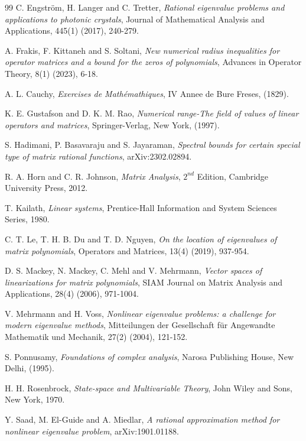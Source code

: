 \documentclass[12pt, reqno]{amsart}
\theoremstyle{definition}
\theoremstyle{remark}
\numberwithin{equation}{section}
\begin{document}
\begin{thebibliography}{99}
C. Engstr\"{o}m, H. Langer and C. Tretter, \emph{Rational eigenvalue problems and 
applications to photonic crystals}, Journal of Mathematical Analysis and Applications, 
445(1) (2017), 240-279.

A. Frakis, F. Kittaneh and S. Soltani, \emph{New numerical radius inequalities 
for operator matrices and a bound for the zeros of polynomials}, Advances in 
Operator Theory, 8(1) (2023), 6-18.

A. L. Cauchy, \emph{Exercises de Math\'emathiques}, IV Annee de Bure Freses, (1829).

K. E. Gustafson and D. K. M. Rao, \emph{Numerical range-The field of values of linear 
operators and matrices}, Springer-Verlag, New York, (1997).

S. Hadimani, P. Basavaraju and S. Jayaraman, \emph{Spectral bounds for certain special 
type of matrix rational functions}, arXiv:2302.02894.

R. A. Horn and C. R. Johnson, \emph{Matrix Analysis}, $2^{nd}$ Edition, 
Cambridge University Press, 2012.

T. Kailath, \emph{Linear systems}, Prentice-Hall Information and System Sciences Series, 
1980.

C. T. Le, T. H. B. Du and T. D. Nguyen, \emph{On the location of eigenvalues of matrix 
polynomials}, Operators and Matrices, 13(4) (2019), 937-954.

D. S. Mackey, N. Mackey, C. Mehl and V. Mehrmann, \emph{Vector spaces of linearizations 
for matrix polynomials}, SIAM Journal on Matrix Analysis and Applications, 28(4) (2006),
 971-1004.	

V. Mehrmann and H. Voss, \emph{Nonlinear eigenvalue problems: a challenge for modern 
eigenvalue methods}, Mitteilungen der Gesellschaft f\"{u}r Angewandte Mathematik und 
Mechanik, 27(2) (2004), 121-152.

S. Ponnusamy, \emph{Foundations of complex analysis}, Narosa Publishing House, New Delhi, 
(1995).

H. H. Rosenbrock, \emph{State-space and Multivariable Theory}, John Wiley and Sons, 
New York, 1970.
 	  	
Y. Saad, M. El-Guide and A. Miedlar, \emph{A rational approximation method for nonlinear 
eigenvalue problem}, arXiv:1901.01188.


\end{thebibliography}
\end{document}
